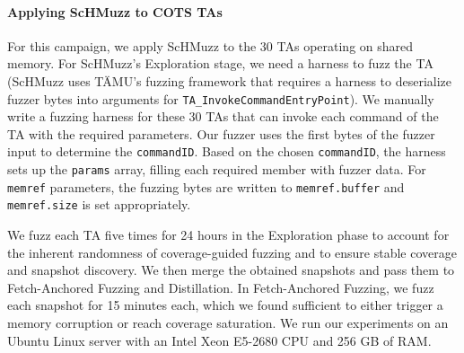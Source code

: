 \documentclass[conference]{IEEEtran}
\newcommand{\sysname}{ScHMuzz\xspace}
\newcommand{\stageone}{Exploration\xspace}
\newcommand{\stagetwo}{Fetch-Anchored Fuzzing\xspace}
\newcommand{\stagethree}{Distillation\xspace}
\newcommand{\numTAsharnessed}{30\xspace}
\newcommand{\numruns}{five\xspace}
\begin{document}
\paragraph{Applying \sysname to COTS TAs}
For this campaign, we apply \sysname to the \numTAsharnessed TAs operating 
on shared memory. 
For \sysname's \stageone stage, we need a harness to fuzz the TA (\sysname uses TÄMU's 
fuzzing framework that requires a harness to deserialize fuzzer bytes into arguments for 
\texttt{TA\_InvokeCommandEntryPoint}). 
We manually write a fuzzing harness for these \numTAsharnessed TAs that can invoke each command 
of the TA with the required parameters.
Our fuzzer uses the first bytes of the fuzzer input to determine the \texttt{commandID}. 
Based on the chosen \texttt{commandID}, the harness sets up the \texttt{params} array, 
filling each required member with fuzzer data. For \texttt{memref} parameters, the fuzzing 
bytes are written to \texttt{memref.buffer} and \texttt{memref.size} is set appropriately.

We fuzz each TA \numruns times for 24 hours in the \stageone 
phase to account for the inherent randomness of coverage-guided 
fuzzing and to ensure stable coverage and snapshot discovery. 
We then merge the obtained snapshots and pass them to 
\stagetwo and \stagethree. In \stagetwo, we fuzz each snapshot for 15 minutes each, 
which we found sufficient to either trigger a memory corruption or reach coverage saturation.
We run our experiments on an Ubuntu Linux server with an Intel Xeon E5-2680 CPU and 256 GB of RAM.
\end{document}
